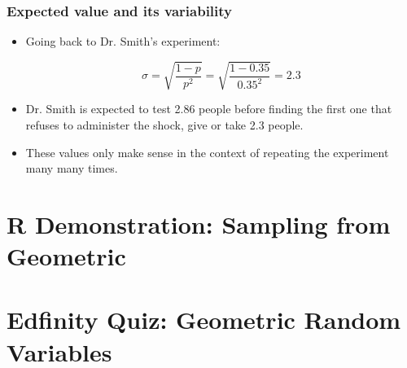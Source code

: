\documentclass[slidestop,compress,mathserif]{beamer}
\begin{document}
\begin{frame}
\frametitle{Expected value and its variability}


\pause

\begin{itemize}

\item Going back to Dr. Smith's experiment:

\[ \sigma = \sqrt{\frac{1-p}{p^2}} = \sqrt{\frac{1-0.35}{0.35^2}} = 2.3 \]

\pause

\item Dr. Smith is expected to test 2.86 people before finding the first one that refuses to administer the shock, give or take 2.3 people.

\pause

\item These values only make sense in the context of repeating the experiment many many times.

\end{itemize}

\end{frame}


\section{R Demonstration: Sampling from Geometric}


\section{Edfinity Quiz: Geometric Random Variables}

\end{document}

